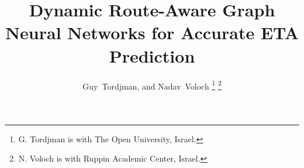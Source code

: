 \documentclass[journal]{IEEEtran}
\title{Dynamic Route-Aware Graph Neural Networks for Accurate ETA Prediction}
\author{Guy~Tordjman, and Nadav~Voloch%
\thanks{G. Tordjman is with The Open University, Israel.}%
\thanks{N. Voloch is with Ruppin Academic Center, Israel.}%
}
\begin{document}
\maketitle



\begin{IEEEkeywords}

\end{IEEEkeywords}











\balance

\end{document}
